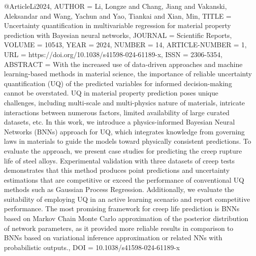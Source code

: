 @Article{Li2024,
AUTHOR = {Li, Longze and Chang, Jiang and Vakanski, Aleksandar and Wang, Yachun and Yao, Tiankai and Xian, Min},
TITLE = {Uncertainty quantification in multivariable regression for material property prediction with Bayesian neural networks},
JOURNAL = {Scientific Reports},
VOLUME = {10543},
YEAR = {2024},
NUMBER = {14},
ARTICLE-NUMBER = {1},
URL = {https://doi.org/10.1038/s41598-024-61189-x},
ISSN = {2306-5354},
ABSTRACT = {With the increased use of data-driven approaches and machine learning-based methods in material science, the importance of reliable uncertainty quantification (UQ) of the predicted variables for informed decision-making cannot be overstated. UQ in material property prediction poses unique challenges, including multi-scale and multi-physics nature of materials, intricate interactions between numerous factors, limited availability of large curated datasets, etc. In this work, we introduce a physics-informed Bayesian Neural Networks (BNNs) approach for UQ, which integrates knowledge from governing laws in materials to guide the models toward physically consistent predictions. To evaluate the approach, we present case studies for predicting the creep rupture life of steel alloys. Experimental validation with three datasets of creep tests demonstrates that this method produces point predictions and uncertainty estimations that are competitive or exceed the performance of conventional UQ methods such as Gaussian Process Regression. Additionally, we evaluate the suitability of employing UQ in an active learning scenario and report competitive performance. The most promising framework for creep life prediction is BNNs based on Markov Chain Monte Carlo approximation of the posterior distribution of network parameters, as it provided more reliable results in comparison to BNNs based on variational inference approximation or related NNs with probabilistic outputs.},
DOI = {10.1038/s41598-024-61189-x}
}